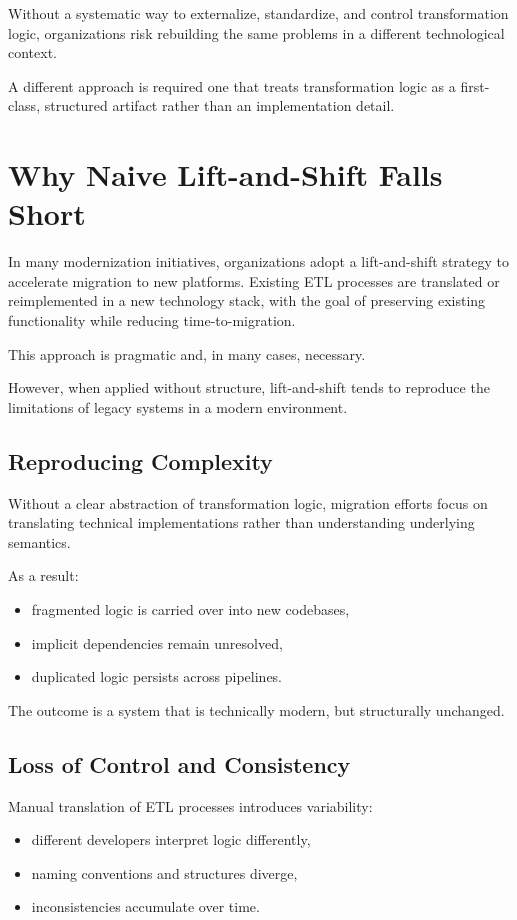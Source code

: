 \documentclass[11pt,a4paper]{article}
\begin{document}
Without a systematic way to externalize, standardize, and control transformation logic, organizations risk rebuilding the same problems in a different technological context.

A different approach is required \textendash{} one that treats transformation logic as a first-class, structured artifact rather than an implementation detail.

\section{Why Naive Lift-and-Shift Falls Short}

In many modernization initiatives, organizations adopt a lift-and-shift strategy to accelerate migration to new platforms. Existing ETL processes are translated or reimplemented in a new technology stack, with the goal of preserving existing functionality while reducing time-to-migration.

This approach is pragmatic and, in many cases, necessary.

However, when applied without structure, lift-and-shift tends to reproduce the limitations of legacy systems in a modern environment.

\subsection{Reproducing Complexity}

Without a clear abstraction of transformation logic, migration efforts focus on translating technical implementations rather than understanding underlying semantics.

As a result:
\begin{itemize}
  \item fragmented logic is carried over into new codebases,
  \item implicit dependencies remain unresolved,
  \item duplicated logic persists across pipelines.
\end{itemize}

The outcome is a system that is technically modern, but structurally unchanged.

\subsection{Loss of Control and Consistency}

Manual translation of ETL processes introduces variability:
\begin{itemize}
  \item different developers interpret logic differently,
  \item naming conventions and structures diverge,
  \item inconsistencies accumulate over time.
\end{itemize}
\end{document}
